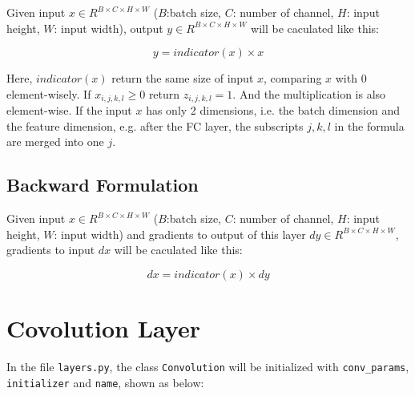 \documentclass[11pt]{article}
\begin{document}
Given input \(x \in R^{B \times C \times H \times W}\) (\(B\):batch
size, \(C\): number of channel, \(H\): input height, \(W\): input
width), output \(y \in R^{B \times C \times H \times W}\) will be
caculated like this:

\begin{equation*}
y=indicator(x) \times x
\end{equation*}

Here, \(indicator(x)\) return the same size of input \(x\), comparing
\(x\) with 0 element-wisely. If \(x_{i,j,k,l} \geq 0\) return
\(z_{i,j,k,l}=1\). And the multiplication is also element-wise. If the
input \(x\) has only 2 dimensions, i.e. the batch dimension and the
feature dimension, e.g. after the FC layer, the subscripts \(j,k,l\) in
the formula are merged into one \(j\).

\subsection{Backward Formulation}\label{backward-formulation}

Given input \(x \in R^{B \times C \times H \times W}\) (\(B\):batch
size, \(C\): number of channel, \(H\): input height, \(W\): input width)
and gradients to output of this layer
\(dy \in R^{B \times C \times H \times W}\), gradients to input \(dx\)
will be caculated like this:

\begin{equation*}
dx=indicator(x) \times dy
\end{equation*}

    \section{Covolution Layer}\label{covolution-layer}

In the file \texttt{layers.py}, the class \texttt{Convolution} will be
initialized with \texttt{conv\_params}, \texttt{initializer} and
\texttt{name}, shown as below:
\end{document}
